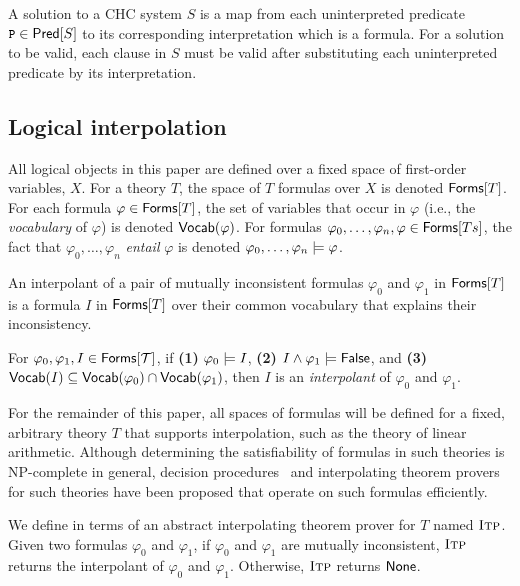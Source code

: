 A solution to a CHC system $S$ is a map from each uninterpreted
predicate $\cc{P} \in \predof{S}$ to its corresponding interpretation
which is a formula.
%
For a solution to be valid, each clause in $S$ must be valid after
substituting each uninterpreted predicate by its interpretation.

\subsection{Logical interpolation}
\label{sec:itps}
%
All logical objects in this paper are defined over a fixed space of first-order
variables, $X$.
%
For a theory $T$, the space of $T$
formulas over $X$ is denoted $\mathsf{Forms}[ T ]$.
%
For each formula $\varphi \in \mathsf{Forms}[ T ]$, the set of
variables that occur in $\varphi$ (i.e., the \emph{vocabulary} of
$\varphi$) is denoted $\mathsf{Vocab}(\varphi)$.
%
For formulas $\varphi_0, \ldots, \varphi_n, \varphi \in
\mathsf{Forms}[ Ts ]$, the fact that $\varphi_0, \ldots, \varphi_n$
\emph{entail} $\varphi$ is denoted $\varphi_0, \ldots, \varphi_n
\models \varphi$.


An interpolant of a pair of mutually inconsistent formulas
$\varphi_0$ and $\varphi_1$ in $\mathsf{Forms}[ T ]$ is a formula $I$ in $\mathsf{Forms}[ T ]$ over 
their common vocabulary that explains their inconsistency.
%
\begin{defn}
  \label{defn:itps}
  For $\varphi_0, \varphi_1, I \in \mathsf{Forms}[ \mathcal{T} ]$, if
  \textbf{(1)} $\varphi_0 \models I$, %
  \textbf{(2)} $I \land \varphi_1 \models \mathsf{False}$, and %
  \textbf{(3)} $\mathsf{Vocab}(I) \subseteq \mathsf{Vocab}(\varphi_0) \cap
  \mathsf{Vocab}(\varphi_1)$,
  then $I$ is an \emph{interpolant} of $\varphi_0$ and $\varphi_1$.
\end{defn}
%
For the remainder of this paper, all spaces of formulas will be
defined for a fixed, arbitrary theory $T$ that supports
interpolation, such as the theory of linear
arithmetic.
Although determining the satisfiability of formulas in such theories
is NP-complete in general, decision procedures~\cite{moura08} and
interpolating theorem provers~\cite{mcmillan04} for such theories have
been proposed that operate on such formulas efficiently.
%

%
We define \sys in terms of an abstract interpolating theorem
prover for $T$ named $\textsc{Itp}$.
%
Given two formulas $\varphi_0$ and $\varphi_1$, if $\varphi_0$ and $\varphi_1$ are mutually 
inconsistent, $\textsc{Itp}$ returns the interpolant of $\varphi_0$ and $\varphi_1$.
%
Otherwise, $\textsc{Itp}$ returns $\mathsf{None}$.

